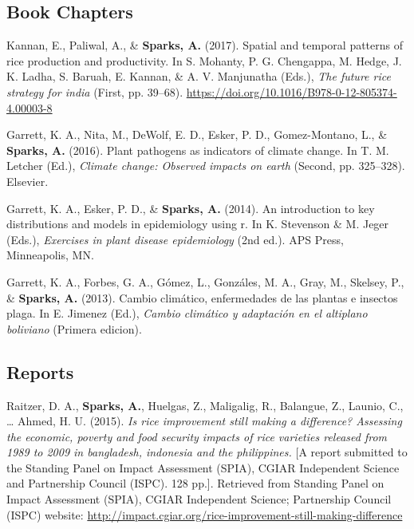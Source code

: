 \documentclass[11pt, a4paper]{awesome-cv}
\begin{document}
\endgroup

\hypertarget{book-chapters}{%
\subsection{Book Chapters}\label{book-chapters}}

\begingroup
\setlength{\parindent}{-0.5in}
\setlength{\leftskip}{0.5in}

\hypertarget{refs_books}{}
\leavevmode\hypertarget{ref-Kannan2017}{}%
Kannan, E., Paliwal, A., \& \textbf{Sparks, A.} (2017). Spatial and temporal patterns of rice production and productivity. In S. Mohanty, P. G. Chengappa, M. Hedge, J. K. Ladha, S. Baruah, E. Kannan, \& A. V. Manjunatha (Eds.), \emph{The future rice strategy for india} (First, pp. 39--68). \url{https://doi.org/10.1016/B978-0-12-805374-4.00003-8}

\leavevmode\hypertarget{ref-Garrett2016}{}%
Garrett, K. A., Nita, M., DeWolf, E. D., Esker, P. D., Gomez-Montano, L., \& \textbf{Sparks, A.} (2016). Plant pathogens as indicators of climate change. In T. M. Letcher (Ed.), \emph{Climate change: Observed impacts on earth} (Second, pp. 325--328). Elsevier.

\leavevmode\hypertarget{ref-Garrett2014}{}%
Garrett, K. A., Esker, P. D., \& \textbf{Sparks, A.} (2014). An introduction to key distributions and models in epidemiology using r. In K. Stevenson \& M. Jeger (Eds.), \emph{Exercises in plant disease epidemiology} (2nd ed.). APS Press, Minneapolis, MN.

\leavevmode\hypertarget{ref-Garrett2013}{}%
Garrett, K. A., Forbes, G. A., Gómez, L., Gonzáles, M. A., Gray, M., Skelsey, P., \& \textbf{Sparks, A.} (2013). Cambio climático, enfermedades de las plantas e insectos plaga. In E. Jimenez (Ed.), \emph{Cambio climático y adaptación en el altiplano boliviano} (Primera edicion).

\endgroup

\hypertarget{reports}{%
\subsection{Reports}\label{reports}}

\begingroup
\setlength{\parindent}{-0.5in}
\setlength{\leftskip}{0.5in}

\hypertarget{refs_reports}{}
\leavevmode\hypertarget{ref-Raitzer2015}{}%
Raitzer, D. A., \textbf{Sparks, A.}, Huelgas, Z., Maligalig, R., Balangue, Z., Launio, C., \ldots{} Ahmed, H. U. (2015). \emph{Is rice improvement still making a difference? Assessing the economic, poverty and food security impacts of rice varieties released from 1989 to 2009 in bangladesh, indonesia and the philippines.} {[}A report submitted to the Standing Panel on Impact Assessment (SPIA), CGIAR Independent Science and Partnership Council (ISPC). 128 pp.{]}. Retrieved from Standing Panel on Impact Assessment (SPIA), CGIAR Independent Science; Partnership Council (ISPC) website: \url{http://impact.cgiar.org/rice-improvement-still-making-difference}
\end{document}
